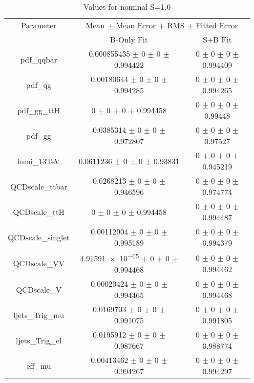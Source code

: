 \begin{table}
\centering
\caption{Values for nominal S=1.0}
\begin{tabular}{ccc}
\toprule
Parameter 	& \multicolumn{2}{c}{Mean $\pm$ Mean Error $\pm$ RMS $\pm$ Fitted Error}\\
 	& B-Only Fit & S+B Fit\\
\midrule
pdf\_qqbar 	& \num{0.000855435} $\pm$ \num{0} $\pm$ \num{0} $\pm$ \num{0.994422} 	& \num{0} $\pm$ \num{0} $\pm$ \num{0} $\pm$ \num{0.994409}\\
pdf\_qg 	& \num{0.00180644} $\pm$ \num{0} $\pm$ \num{0} $\pm$ \num{0.994285} 	& \num{0} $\pm$ \num{0} $\pm$ \num{0} $\pm$ \num{0.994265}\\
pdf\_gg\_ttH 	& \num{0} $\pm$ \num{0} $\pm$ \num{0} $\pm$ \num{0.994458} 	& \num{0} $\pm$ \num{0} $\pm$ \num{0} $\pm$ \num{0.99448}\\
pdf\_gg 	& \num{0.0385314} $\pm$ \num{0} $\pm$ \num{0} $\pm$ \num{0.972807} 	& \num{0} $\pm$ \num{0} $\pm$ \num{0} $\pm$ \num{0.97527}\\
lumi\_13TeV 	& \num{0.0611236} $\pm$ \num{0} $\pm$ \num{0} $\pm$ \num{0.93831} 	& \num{0} $\pm$ \num{0} $\pm$ \num{0} $\pm$ \num{0.945219}\\
QCDscale\_ttbar 	& \num{0.0268213} $\pm$ \num{0} $\pm$ \num{0} $\pm$ \num{0.946596} 	& \num{0} $\pm$ \num{0} $\pm$ \num{0} $\pm$ \num{0.974774}\\
QCDscale\_ttH 	& \num{0} $\pm$ \num{0} $\pm$ \num{0} $\pm$ \num{0.994458} 	& \num{0} $\pm$ \num{0} $\pm$ \num{0} $\pm$ \num{0.994487}\\
QCDscale\_singlet 	& \num{0.00112904} $\pm$ \num{0} $\pm$ \num{0} $\pm$ \num{0.995189} 	& \num{0} $\pm$ \num{0} $\pm$ \num{0} $\pm$ \num{0.994379}\\
QCDscale\_VV 	& \num{4.91591e-05} $\pm$ \num{0} $\pm$ \num{0} $\pm$ \num{0.994468} 	& \num{0} $\pm$ \num{0} $\pm$ \num{0} $\pm$ \num{0.994462}\\
QCDscale\_V 	& \num{0.00020424} $\pm$ \num{0} $\pm$ \num{0} $\pm$ \num{0.994465} 	& \num{0} $\pm$ \num{0} $\pm$ \num{0} $\pm$ \num{0.994468}\\
ljets\_Trig\_mu 	& \num{0.0169703} $\pm$ \num{0} $\pm$ \num{0} $\pm$ \num{0.991075} 	& \num{0} $\pm$ \num{0} $\pm$ \num{0} $\pm$ \num{0.991805}\\
ljets\_Trig\_el 	& \num{0.0195912} $\pm$ \num{0} $\pm$ \num{0} $\pm$ \num{0.987667} 	& \num{0} $\pm$ \num{0} $\pm$ \num{0} $\pm$ \num{0.988774}\\
eff\_mu 	& \num{0.00413462} $\pm$ \num{0} $\pm$ \num{0} $\pm$ \num{0.994267} 	& \num{0} $\pm$ \num{0} $\pm$ \num{0} $\pm$ \num{0.994297}\\

\end{tabular}
\end{table}
